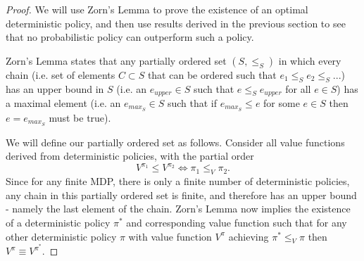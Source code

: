 \documentclass[11pt]{article} %
\begin{document}
\begin{proof}
	We will use Zorn's Lemma to prove the existence of an optimal deterministic policy, and then use results derived in the previous section to see that no probabilistic policy can outperform such a policy.

	Zorn's Lemma states that any partially ordered set $(S, \le_S)$ in which every chain (i.e. set of elements $C \subset S$ that can be ordered such that $e_1 \le_S e_2 \le_S ... $) has an upper bound in $S$ (i.e. an $e_{upper} \in S$ such that $e \le_S e_{upper}$ for all $e \in S$) has a maximal element (i.e. an $e_{max_S} \in S$ such that if $e_{max_S} \le e$ for some $e \in S$ then $e = e_{max_S}$ must be true).

We will define our partially ordered set as follows. Consider all value functions derived from deterministic policies, with the partial order $$V^{\pi_1} \le V^{\pi_2} \Leftrightarrow \pi_1 \le_V \pi_2.$$ Since for any finite MDP, there is only a finite number of deterministic policies, any chain in this partially ordered set is finite, and therefore has an upper bound - namely the last element of the chain. Zorn's Lemma now implies the existence of a deterministic policy $\pi^*$ and corresponding value function such that for any other deterministic policy $\pi$ with value function $V^{\pi}$ achieving $\pi^* \le_V \pi$ then $V^{\pi} \equiv V^{\pi^*}.$
\end{proof}
\end{document}
